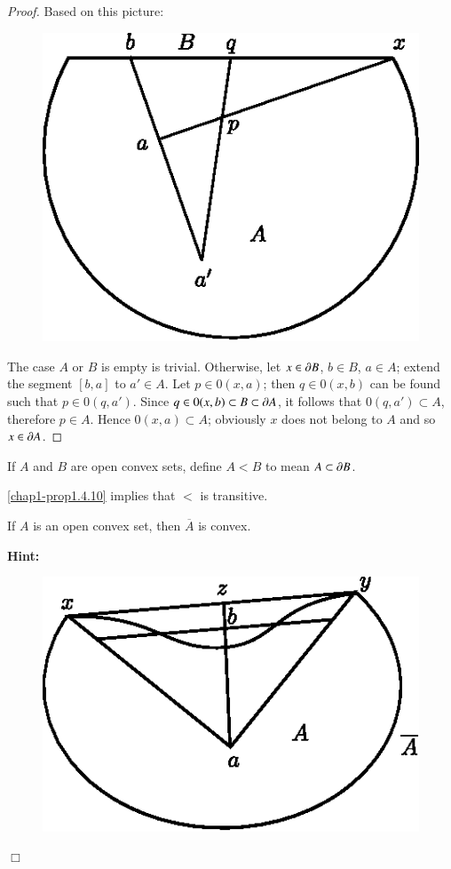 \begin{proof}
Based on this picture:
\begin{figure}[H]
\centering
\includegraphics{figure/fig3.eps}
\end{figure}

The case $A$ or $B$ is empty is trivial. Otherwise, let $x\in \partial B$, $b\in B$, $a\in A$; extend the segment $[b,a]$ to $a'\in A$. Let $p\in 0(x,a)$; then $q\in 0(x,b)$ can be found such that $p\in 0(q,a')$. Since $q\in 0(x,b)\subset B\subset \partial A$, it follows that $0(q,a')\subset A$, therefore $p\in A$. Hence $0(x,a)\subset A$; obviously $x$ does not belong to $A$ and so $x\in \partial A$.
\end{proof}

\begin{definition}\label{chap1-defi1.4.11}
If $A$ and $B$ are open convex sets, define $A<B$ to mean $A\subset \partial B$.
\end{definition}

\ref{chap1-prop1.4.10} implies that $<$ is transitive.

\begin{ex}\label{chap1-ex1.4.12}
If $A$ is an open convex set, then $\overline{A}$ is convex.
\end{ex}

\noindent
{\bf Hint:}
\begin{figure}[H]
\centering
\includegraphics{figure/fig4.eps}
\end{figure}
\hfill$\Box$

